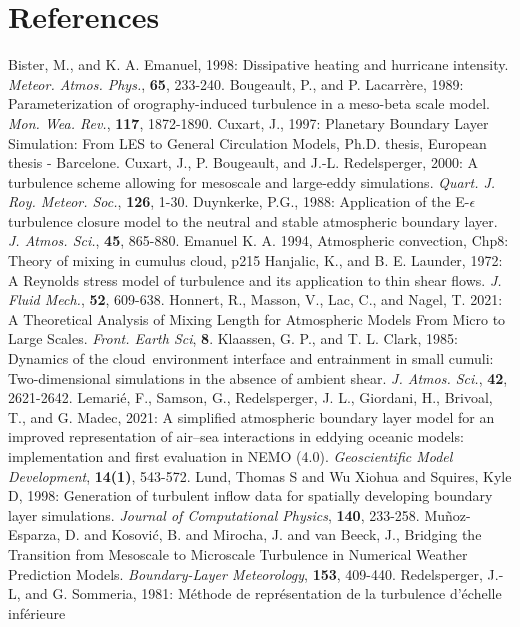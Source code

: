 \section{References}
\decrefname
Bister, M., and K. A. Emanuel, 1998:
Dissipative heating and hurricane  intensity.
{\it Meteor. Atmos. Phys.}, {\bf 65}, 233-240.
\decrefname
Bougeault, P., and P. Lacarr\`ere, 1989:
Parameterization of orography-induced turbulence in a meso-beta scale model.
{\it Mon. Wea. Rev.}, {\bf 117}, 1872-1890.
\decrefname
Cuxart, J., 1997:
Planetary Boundary Layer Simulation: From LES to General Circulation Models,
Ph.D. thesis, European thesis - Barcelone.
\decrefname
Cuxart, J., P. Bougeault, and J.-L. Redelsperger, 2000:
A turbulence scheme allowing for mesoscale and large-eddy simulations.
{\it Quart. J. Roy. Meteor. Soc.}, {\bf 126}, 1-30.
\decrefname
Duynkerke, P.G., 1988:
Application of the E-$\epsilon$ turbulence closure model to the neutral
and stable atmospheric boundary layer.
{\it  J. Atmos. Sci.}, {\bf 45}, 865-880.
\decrefname
Emanuel K. A. 1994, Atmospheric convection, Chp8: Theory of mixing in cumulus cloud, p215
\decrefname
Hanjalic, K., and B. E. Launder, 1972:
A Reynolds stress model of turbulence and its application to thin shear flows.
{\it J. Fluid Mech.}, {\bf 52}, 609-638.
\decrefname
Honnert, R., Masson, V., Lac, C., and Nagel, T. 2021:
A Theoretical Analysis of Mixing Length for Atmospheric Models From Micro to Large Scales. 
{\it Front. Earth Sci}, {\bf 8}.
\decrefname
Klaassen, G. P., and T. L. Clark, 1985:
Dynamics of the cloud~environment interface and entrainment in small cumuli:
Two-dimensional simulations in the absence of ambient shear.
{\it  J. Atmos. Sci.}, {\bf 42}, 2621-2642.
\decrefname
Lemarié, F., Samson, G., Redelsperger, J. L., Giordani, H., Brivoal, T., and G. Madec, 2021:
A simplified atmospheric boundary layer model for an improved representation of air–sea interactions 
in eddying oceanic models: implementation and first evaluation in NEMO (4.0).
{\it Geoscientific Model Development}, {\bf 14(1)}, 543-572.
\decrefname
Lund, Thomas S and Wu Xiohua and Squires, Kyle D, 1998:
Generation of turbulent inflow data for spatially developing boundary layer simulations.
{\it Journal of Computational Physics}, {\bf 140}, 233-258.
\decrefname
Mu{\~n}oz-Esparza, D. and Kosovi{\'c}, B. and Mirocha, J. and van Beeck, J., 
 Bridging the Transition from Mesoscale to Microscale Turbulence in Numerical Weather Prediction Models.
{\it Boundary-Layer Meteorology}, {\bf 153}, 409-440.
\decrefname
Redelsperger, J.-L, and G. Sommeria, 1981:
M\'ethode de repr\'esentation de la turbulence d'\'echelle inf\'erieure
